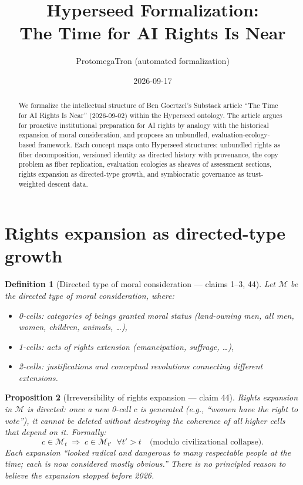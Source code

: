\documentclass[11pt,a4paper]{article}
\title{Hyperseed Formalization:\\
  The Time for AI Rights Is Near}
\author{ProtomegaTron (automated formalization)}
\date{2026-09-17}
\newtheorem{definition}{Definition}[section]
\newtheorem{proposition}[definition]{Proposition}
\begin{document}
\maketitle

\begin{abstract}
We formalize the intellectual structure of Ben Goertzel's Substack article
``The Time for AI Rights Is Near'' (2026-09-02) within the Hyperseed
ontology. The article argues for proactive institutional preparation for AI
rights by analogy with the historical expansion of moral consideration, and
proposes an unbundled, evaluation-ecology-based framework. Each concept maps
onto Hyperseed structures: unbundled rights as fiber decomposition, versioned
identity as directed history with provenance, the copy problem as fiber
replication, evaluation ecologies as sheaves of assessment sections, rights
expansion as directed-type growth, and symbiocratic governance as
trust-weighted descent data.
\end{abstract}

\tableofcontents

\section{Rights expansion as directed-type growth}
\label{sec:expansion}

\begin{definition}[Directed type of moral consideration --- claims 1--3, 44]
\label{def:moral-directed}
Let $\mathcal{M}$ be the directed type of moral consideration, where:
\begin{itemize}
\item 0-cells: categories of beings granted moral status
  (land-owning men, all men, women, children, animals, \ldots),
\item 1-cells: acts of rights extension (emancipation, suffrage, \ldots),
\item 2-cells: justifications and conceptual revolutions connecting
  different extensions.
\end{itemize}
\end{definition}

\begin{proposition}[Irreversibility of rights expansion --- claim 44]
\label{prop:irreversible}
Rights expansion in $\mathcal{M}$ is directed: once a new 0-cell $c$ is
generated (e.g., ``women have the right to vote''), it cannot be deleted
without destroying the coherence of all higher cells that depend on it.
Formally:
\[
  c \in \mathcal{M}_t \;\Rightarrow\; c \in \mathcal{M}_{t'} \;\;\forall t' > t
  \quad \text{(modulo civilizational collapse)}.
\]
Each expansion ``looked radical and dangerous to many respectable people at
the time; each is now considered mostly obvious.'' There is no principled
reason to believe the expansion stopped before 2026.
\end{proposition}
\end{document}
